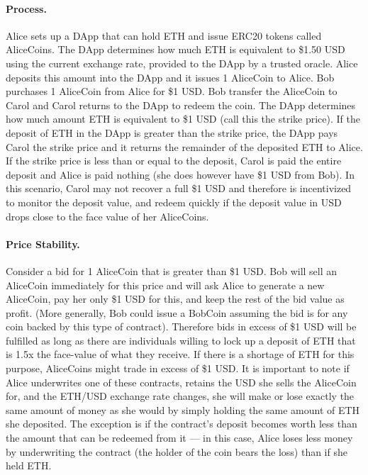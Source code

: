 \paragraph{Process.} Alice sets up a DApp that can hold ETH and issue ERC20 tokens called AliceCoins. The DApp determines how much ETH is equivalent to \$1.50 USD using the current exchange rate, provided to the DApp by a trusted oracle. Alice deposits this amount into the DApp and it issues 1 AliceCoin to Alice. Bob purchases 1 AliceCoin from Alice for \$1 USD. Bob transfer the AliceCoin to Carol and Carol returns to the DApp to redeem the coin. The DApp determines how much amount ETH is equivalent to \$1 USD (call this the strike price). If the deposit of ETH in the DApp is greater than the strike price, the DApp pays Carol the strike price and it returns the remainder of the deposited ETH to Alice. If the strike price is less than or equal to the deposit, Carol is paid the entire deposit and Alice is paid nothing (she does however have \$1 USD from Bob). In this scenario, Carol may not recover a full \$1 USD and therefore is incentivized to monitor the deposit value, and redeem quickly if the deposit value in USD drops close to the face value of her AliceCoins.

\paragraph{Price Stability.} Consider a bid for 1 AliceCoin that is greater than \$1 USD. Bob will sell an AliceCoin immediately for this price and will ask Alice to generate a new AliceCoin, pay her only \$1 USD for this, and keep the rest of the bid value as profit. (More generally, Bob could issue a BobCoin assuming the bid is for any coin backed by this type of contract). Therefore bids in excess of \$1 USD will be fulfilled as long as there are individuals willing to lock up a deposit of ETH that is 1.5x the face-value of what they receive. If there is a shortage of ETH for this purpose, AliceCoins might trade in excess of \$1 USD. It is important to note if Alice underwrites one of these contracts, retains the USD she sells the AliceCoin for, and the ETH/USD exchange rate changes, she will make or lose exactly the same amount of money as she would by simply holding the same amount of ETH she deposited. The exception is if the contract's deposit becomes worth less than the amount that can be redeemed from it --- in this case, Alice loses less money by underwriting the contract (the holder of the coin bears the loss) than if she held ETH.

